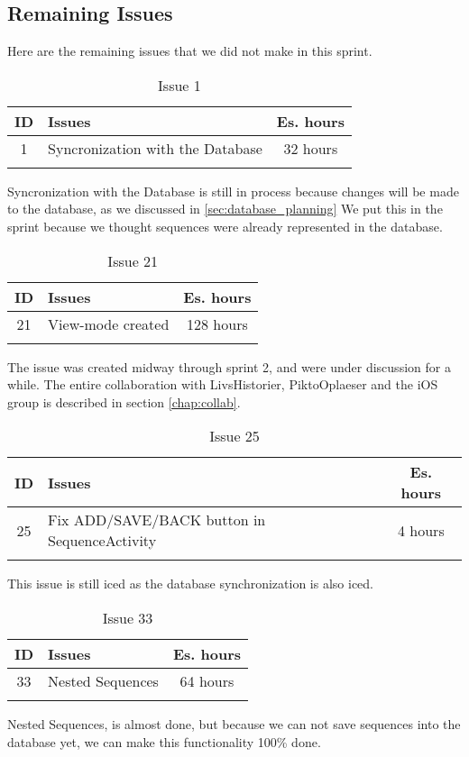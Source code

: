\subsection{Remaining Issues}
\label{subsec:spr2_RemainingIssues}
Here are the remaining issues that we did not make in this sprint.

\begin{longtable} { | c | p{12cm} | c | } 
\hline
	ID 	&	Issues	&		 Es. hours \\\hline
	1	&	Syncronization with the Database 	&	32 hours	\\\hline
\caption{Issue 1}
\label{tab:spr2_syncwithdatabase}
\end{longtable}

Syncronization with the Database is still in process because changes will be made to the database, as we discussed in \ref{sec:database_planning} We put this in the sprint because we thought sequences were already represented in the database.


\begin{longtable} { | c | p{12cm} | c | } 
\hline
	ID 	&	Issues	&		 Es. hours \\\hline
	21	&	View-mode created 	&	128 hours	\\\hline
\caption{Issue 21}
\label{tab:spr2_viewmodecreated}
\end{longtable}

The issue was created midway through sprint 2, and were under discussion for a while. The entire collaboration with LivsHistorier, PiktoOplaeser and the iOS group is described in section \ref{chap:collab}.\\

\begin{longtable} { | c | p{12cm} | c | } 
\hline
	ID 	&	Issues	&		 Es. hours \\\hline
	25	&	Fix ADD/SAVE/BACK button in SequenceActivity 	&	4 hours	\\\hline
\caption{Issue 25}
\label{tab:spr2_addsavebackbuttons}
\end{longtable}

This issue is still iced as the database synchronization is also iced.

\begin{longtable} { | c | p{12cm} | c | } 
\hline
	ID 	&	Issues	&		 Es. hours \\\hline
	33	&	Nested Sequences 	&	64 hours	\\\hline
\caption{Issue 33}
\label{tab:spr2_nestedsequences}
\end{longtable}

Nested Sequences, is almost done, but because we can not save sequences into the database yet, we can make this functionality 100\% done.\\